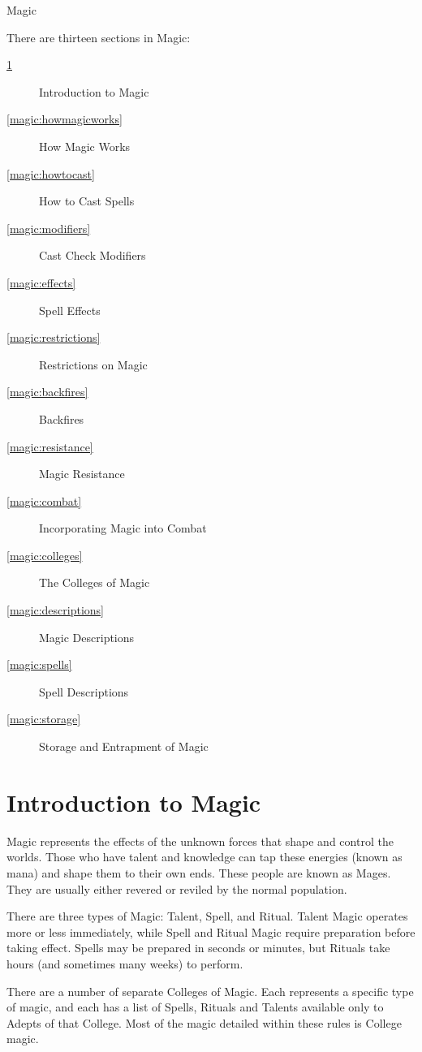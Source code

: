 \begin{Chapter}{Magic}

There are thirteen sections in Magic: 
\begin{description}
\item[\ref{magic:introduction}] Introduction to Magic
\item[\ref{magic:howmagicworks}] How Magic Works
\item[\ref{magic:howtocast}] How to Cast Spells
\item[\ref{magic:modifiers}] Cast Check Modifiers
\item[\ref{magic:effects}] Spell Effects
\item[\ref{magic:restrictions}] Restrictions on Magic
\item[\ref{magic:backfires}] Backfires
\item[\ref{magic:resistance}] Magic Resistance
\item[\ref{magic:combat}] Incorporating Magic into Combat
\item[\ref{magic:colleges}] The Colleges of Magic
\item[\ref{magic:descriptions}] Magic Descriptions
\item[\ref{magic:spells}] Spell Descriptions
\item[\ref{magic:storage}] Storage and Entrapment of Magic
\end{description}

\section{Introduction to Magic}
\label{magic:introduction}

Magic represents the effects of the unknown forces that shape and
control the worlds. Those who have talent and knowledge can tap these
energies (known as mana) and shape them to their own ends. These
people are known as Mages. They are usually either revered or reviled
by the normal population.

There are three types of Magic: Talent, Spell, and Ritual.  Talent
Magic operates more or less immediately, while Spell and Ritual Magic
require preparation before taking effect.  Spells may be prepared in
seconds or minutes, but Rituals take hours (and sometimes many weeks)
to perform.

There are a number of separate Colleges of Magic.  Each represents a
specific type of magic, and each has a list of Spells, Rituals and
Talents available only to Adepts of that College. Most of the magic
detailed within these rules is College magic.


\end{Chapter}
